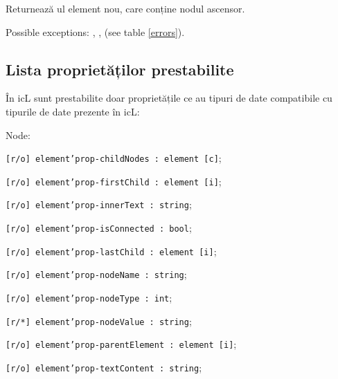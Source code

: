 Returnează ul element nou, care conține nodul ascensor.

Possible exceptions: , ,  (see table \ref{errors}).

\subsection{Lista proprietăților prestabilite}
\label{elements:predefined:properties}

În icL sunt prestabilite doar proprietățile ce au tipuri de date compatibile cu tipurile de date prezente în icL:
\begin{icItems}
	\item Node:	
	\begin{icItems}
		\item \texttt{[r/o] element'prop-childNodes : element [c]};
		\item \texttt{[r/o] element'prop-firstChild : element [i]};
		\item \texttt{[r/o] element'prop-innerText : string};
		\item \texttt{[r/o] element'prop-isConnected : bool};
		\item \texttt{[r/o] element'prop-lastChild : element [i]};
		\item \texttt{[r/o] element'prop-nodeName : string};
		\item \texttt{[r/o] element'prop-nodeType : int};
		\item \texttt{[r/*] element'prop-nodeValue : string};
		\item \texttt{[r/o] element'prop-parentElement : element [i]};
		\item \texttt{[r/o] element'prop-textContent : string};
	\end{icItems}
	

\end{icItems}
